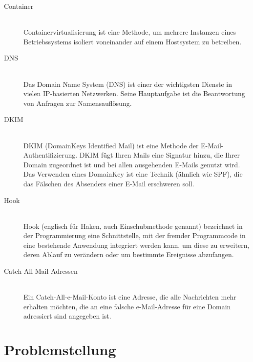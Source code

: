 \documentclass[a4paper,11pt,singlespacing]{article}
\begin{document}
\begin{description}
	\item[Container\label{itm:Container}]\hfill \\
		Containervirtualisierung ist eine Methode, um mehrere Instanzen eines Betriebssystems isoliert voneinander auf einem Hostsystem zu betreiben.\cite{Container}
	\item[DNS\label{itm:DNS}]\hfill \\
		Das Domain Name System (DNS) ist einer der wichtigsten Dienste in vielen IP-basierten Netzwerken. Seine Hauptaufgabe ist die Beantwortung von Anfragen zur Namensauflösung.\cite{DNS}
	\item[DKIM\label{itm:DKIM}]\hfill \\
		DKIM (DomainKeys Identified Mail) ist eine Methode der E-Mail-Authentifizierung. DKIM fügt Ihren Mails eine Signatur hinzu, die Ihrer Domain zugeordnet ist und bei allen ausgehenden E-Mails genutzt wird. Das Verwenden eines DomainKey ist eine Technik (ähnlich wie SPF), die das Fälschen des Absenders einer E-Mail erschweren soll.\cite{DKIM}
	\item[Hook\label{itm:Hook}]\hfill \\
		Hook (englisch für Haken, auch Einschubmethode genannt) bezeichnet in der Programmierung eine Schnittstelle, mit der fremder Programmcode in eine bestehende Anwendung integriert werden kann, um diese zu erweitern, deren Ablauf zu verändern oder um bestimmte Ereignisse abzufangen.\cite{Hook}
	\item[Catch-All-Mail-Adressen\label{itm:Catch-All-Mail}]\hfill \\
		Ein Catch-All-e-Mail-Konto ist eine Adresse, die alle Nachrichten mehr erhalten möchten, die an eine falsche e-Mail-Adresse für eine Domain adressiert sind angegeben ist.\cite{Catch-All-Mail}
	\end{description}


\section{Problemstellung}\label{sec:Problemstellung}

\end{document}
